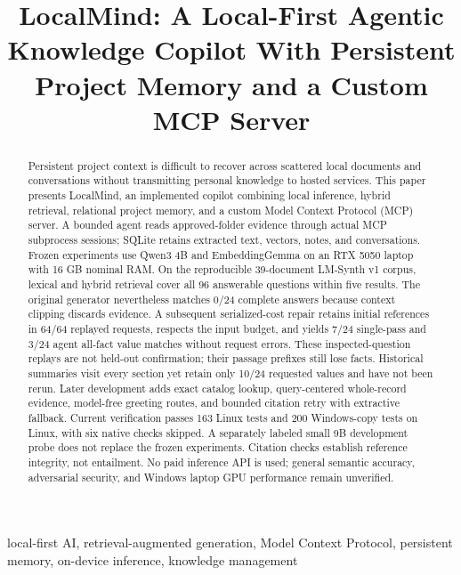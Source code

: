 \documentclass[conference,letterpaper]{IEEEtran}
\begin{document}
\title{LocalMind: A Local-First Agentic Knowledge Copilot With Persistent Project Memory and a Custom MCP Server}
\author{
}
\maketitle

\begin{abstract}
Persistent project context is difficult to recover across scattered local documents and conversations without transmitting personal knowledge to hosted services. This paper presents LocalMind, an implemented copilot combining local inference, hybrid retrieval, relational project memory, and a custom Model Context Protocol (MCP) server. A bounded agent reads approved-folder evidence through actual MCP subprocess sessions; SQLite retains extracted text, vectors, notes, and conversations. Frozen experiments use Qwen3 4B and EmbeddingGemma on an RTX 5050 laptop with 16 GB nominal RAM. On the reproducible 39-document LM-Synth v1 corpus, lexical and hybrid retrieval cover all 96 answerable questions within five results. The original generator nevertheless matches 0/24 complete answers because context clipping discards evidence. A subsequent serialized-cost repair retains initial references in 64/64 replayed requests, respects the input budget, and yields 7/24 single-pass and 3/24 agent all-fact value matches without request errors. These inspected-question replays are not held-out confirmation; their passage prefixes still lose facts. Historical summaries visit every section yet retain only 10/24 requested values and have not been rerun. Later development adds exact catalog lookup, query-centered whole-record evidence, model-free greeting routes, and bounded citation retry with extractive fallback. Current verification passes 163 Linux tests and 200 Windows-copy tests on Linux, with six native checks skipped. A separately labeled small 9B development probe does not replace the frozen experiments. Citation checks establish reference integrity, not entailment. No paid inference API is used; general semantic accuracy, adversarial security, and Windows laptop GPU performance remain unverified.
\end{abstract}

\begin{IEEEkeywords}
local-first AI, retrieval-augmented generation, Model Context Protocol, persistent memory, on-device inference, knowledge management
\end{IEEEkeywords}
\end{document}
